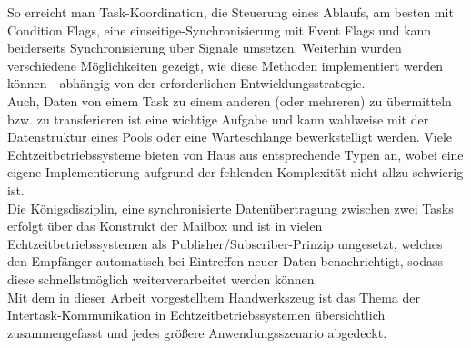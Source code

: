 \documentclass{llncs}
\begin{document}
So erreicht man Task-Koordination, die Steuerung eines Ablaufs, am besten mit Condition Flags, eine einseitige-Synchronisierung mit Event Flags und kann beiderseits Synchronisierung über Signale umsetzen. Weiterhin wurden verschiedene Möglichkeiten gezeigt, wie diese Methoden implementiert werden können - abhängig von der erforderlichen Entwicklungsstrategie.\\

Auch, Daten von einem Task zu einem anderen (oder mehreren) zu übermitteln bzw. zu transferieren ist eine wichtige Aufgabe und kann wahlweise mit der Datenstruktur eines Pools oder eine Warteschlange bewerkstelligt werden. Viele Echtzeitbetriebssysteme bieten von Haus aus entsprechende Typen an, wobei eine eigene Implementierung aufgrund der fehlenden Komplexität nicht allzu schwierig ist.\\

Die Königsdisziplin, eine synchronisierte Datenübertragung zwischen zwei Tasks erfolgt über das Konstrukt der Mailbox und ist in vielen Echtzeitbetriebssystemen als Publisher/Subscriber-Prinzip umgesetzt, welches den Empfänger automatisch bei Eintreffen neuer Daten benachrichtigt, sodass diese schnellstmöglich weiterverarbeitet werden können.\\

Mit dem in dieser Arbeit vorgestelltem Handwerkszeug ist das Thema der Intertask-Kommunikation in Echtzeitbetriebssystemen übersichtlich zusammengefasst und jedes größere Anwendungsszenario abgedeckt.

\printbibliography
\end{document}
